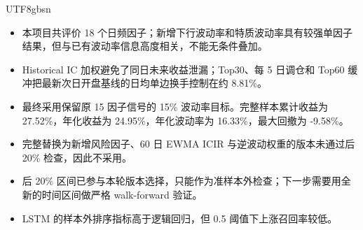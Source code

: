 \documentclass[a4paper,11pt,openany]{report}
\begin{document}
\begin{CJK*}{UTF8}{gbsn}
\begin{itemize}
  \item 本项目共评价 18 个日频因子；新增下行波动率和特质波动率具有较强单因子结果，但与已有波动率信息高度相关，不能无条件叠加。
  \item Historical IC 加权避免了同日未来收益泄漏；Top30、每 5 日调仓和 Top60 缓冲把最新次日开盘基线的日均单边换手控制在约 8.81\%。
  \item 最终采用保留原 15 因子信号的 15\% 波动率目标。完整样本累计收益为 27.52\%，年化收益为 24.95\%，年化波动率为 16.33\%，最大回撤为 -9.58\%。
  \item 完整替换为新增风险因子、60 日 EWMA ICIR 与逆波动权重的版本未通过后 20\% 检查，因此不采用。
  \item 后 20\% 区间已参与本轮版本选择，只能作为准样本外检查；下一步需要用全新的时间区间做严格 walk-forward 验证。
  \item LSTM 的样本外排序指标高于逻辑回归，但 0.5 阈值下上涨召回率较低。
\end{itemize}

\end{CJK*}
\end{document}
